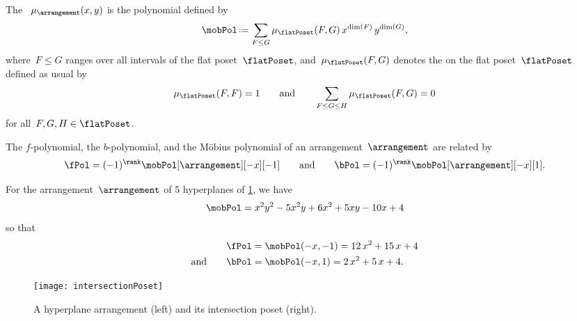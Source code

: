 \begin{definition}
The ~$\mu_{\arrangement}(x,y)$ is the polynomial defined by
\[
\mobPol \eqdef \sum_{F \le G} \mu_{\flatPoset}(F,G) \, x^{\dim(F)} \, y^{\dim(G)},
\]
where~$F \le G$ ranges over all intervals of the flat poset~$\flatPoset$, and~$\mu_{\flatPoset}(F,G)$ denotes the  on the flat poset~$\flatPoset$ defined as usual by
\[
\mu_{\flatPoset}(F, F) = 1
\qquad\text{and}\qquad
\sum_{F \le G \le H} \mu_{\flatPoset}(F,G) = 0
\]
for all~$F, G, H \in \flatPoset$.
\end{definition}

\begin{theorem}
The $f$-polynomial, the $b$-polynomial, and the M\"obius polynomial of an arrangement~$\arrangement$ are related by
\[
\fPol = (-1)^{\rank} \mobPol[\arrangement][-x][-1]
\qquad\text{and}\qquad
\bPol = (-1)^{\rank} \mobPol[\arrangement][-x][1].
\]
\end{theorem}


\begin{example}
For the arrangement~$\arrangement$ of $5$ hyperplanes of \cref{fig:arrangement}, we have
\[
\mobPol = x^2y^2 - 5x^2y + 6x^2 + 5xy - 10x + 4
\]
so that
\begin{align*}
\fPol & = \mobPol(-x,-1) = 12 \, x^2 + 15 \, x + 4 \\
\text{and}\qquad
\bPol & = \mobPol(-x,1) = 2 \, x^2 + 5 \, x + 4.
\end{align*}
%
\begin{figure}
	\texttt{[image: intersectionPoset]}
	\caption{A hyperplane arrangement (left) and its intersection poset (right).}
	\label{fig:arrangement}
\end{figure}
\end{example}

